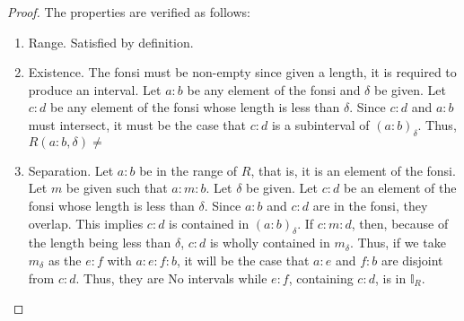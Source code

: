 \documentclass[12pt]{article}
\begin{document}
\begin{proof}
    The properties are verified as follows: 
    \begin{enumerate}
        \item Range. Satisfied by definition. 
        \item Existence. The fonsi must be non-empty since given a length, it is required to produce an interval. Let $a:b$ be any element of the fonsi and $\delta$ be given. Let $c:d$ be any element of the fonsi whose length is less than $\delta$. Since $c:d$ and $a:b$ must intersect, it must be the case that $c:d$ is a subinterval of $(a:b)_\delta$. Thus, $R(a:b, \delta) \neq $
        \item Separation. 
        Let $a:b$ be in the range of $R$, that is, it is an element of the fonsi. Let $m$ be given such that $a:m:b$. Let $\delta$ be given. Let $c:d$ be an element of the fonsi whose length is less than $\delta$. Since $a:b$ and $c:d$ are in the fonsi, they overlap. This implies $c:d$ is contained in $(a:b)_\delta$. If $c:m:d$, then, because of the length being less than $\delta$, $c:d$ is wholly contained in $m_\delta$. Thus, if we take $m_\delta$ as the $e:f$ with $a:e:f:b$, it will be the case that $a:e$ and $f:b$ are disjoint from $c:d$. Thus, they are No intervals while $e:f$, containing $c:d$, is in $\mathbb{I}_R$. 
        

\end{enumerate}
\end{proof}
\end{document}
